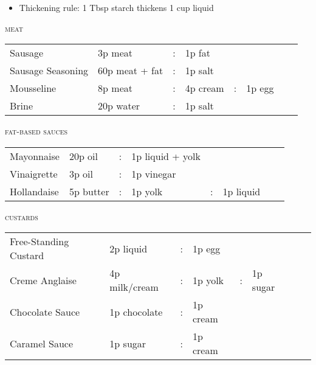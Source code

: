 \documentclass[letterpaper,11pt]{article}
\newcommand{\sectionheader}[1]{
    \vspace{0.5em}
    {\small\textsc{#1}} \\
    \vspace{1em}
}
\begin{document}
{ \small
\begin{itemize}[topsep=4pt]
  \item Thickening rule: 1 Tbsp starch thickens 1 cup liquid
\end{itemize}
}

\sectionheader{meat}
{ \small
{}
\begin{tabularx}{\textwidth}{ p{4cm} X c X c X c X }
\cellcolor{gray!20}
Sausage & 3p meat & : & 1p fat & & & & \\
Sausage Seasoning & 60p meat + fat & : & 1p salt & & & & \\
\cellcolor{gray!20}
Mousseline & 8p meat & : & 4p cream & : & 1p egg & & \\
Brine & 20p water & : & 1p salt & & & & \\
\end{tabularx}
}

\sectionheader{fat-based sauces}
{ \small
{}
\begin{tabularx}{\textwidth}{ p{4cm} X c X c X c X }
\cellcolor{gray!20}
Mayonnaise & 20p oil & : & 1p liquid +  yolk & & & & \\
Vinaigrette & 3p oil & : & 1p vinegar & & & & \\
\cellcolor{gray!20}
Hollandaise & 5p butter & : & 1p yolk & : & 1p liquid & & \\
\end{tabularx}
}

\sectionheader{custards}
{ \small
{}
\begin{tabularx}{\textwidth}{ p{4cm} X c X c X c X }
\cellcolor{gray!20}
Free-Standing Custard & 2p liquid & : & 1p egg & & & & \\
Creme Anglaise & 4p milk/cream & : & 1p yolk & : & 1p sugar & & \\
\cellcolor{gray!20}
Chocolate Sauce & 1p chocolate & : & 1p cream & & & & \\
Caramel Sauce & 1p sugar & : & 1p cream & & & & \\
\end{tabularx}
}
\end{document}
